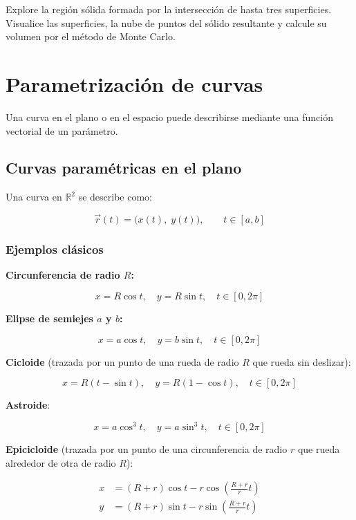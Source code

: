 \documentclass[
]{book}
\begin{document}
Explore la región sólida formada por la intersección de hasta tres superficies. Visualice las superficies, la nube de puntos del sólido resultante y calcule su volumen por el método de Monte Carlo.

\section{Parametrización de curvas}\label{parametrizaciuxf3n-de-curvas}

Una curva en el plano o en el espacio puede describirse mediante una función vectorial de un parámetro.

\subsection{Curvas paramétricas en el plano}\label{curvas-paramuxe9tricas-en-el-plano}

Una curva en \(\mathbb{R}^2\) se describe como:

\[
\vec{r}(t) = \bigl( x(t),\; y(t) \bigr), \qquad t \in [a, b]
\]

\subsubsection{Ejemplos clásicos}\label{ejemplos-cluxe1sicos}

\textbf{Circunferencia de radio \(R\):}

\[
x = R\cos t, \quad y = R\sin t, \quad t \in [0, 2\pi]
\]

\textbf{Elipse de semiejes \(a\) y \(b\):}

\[
x = a\cos t, \quad y = b\sin t, \quad t \in [0, 2\pi]
\]

\textbf{Cicloide} (trazada por un punto de una rueda de radio \(R\) que rueda sin deslizar):

\[
x = R(t - \sin t), \quad y = R(1 - \cos t), \quad t \in [0, 2\pi]
\]

\textbf{Astroide}:

\[
x = a\cos^3 t, \quad y = a\sin^3 t, \quad t \in [0, 2\pi]
\]

\textbf{Epicicloide} (trazada por un punto de una circunferencia de radio \(r\) que rueda alrededor de otra de radio \(R\)):

\[
\begin{aligned}
x &= (R + r)\cos t - r\cos\left(\frac{R + r}{r}t\right) \\
y &= (R + r)\sin t - r\sin\left(\frac{R + r}{r}t\right)
\end{aligned}
\]
\end{document}
